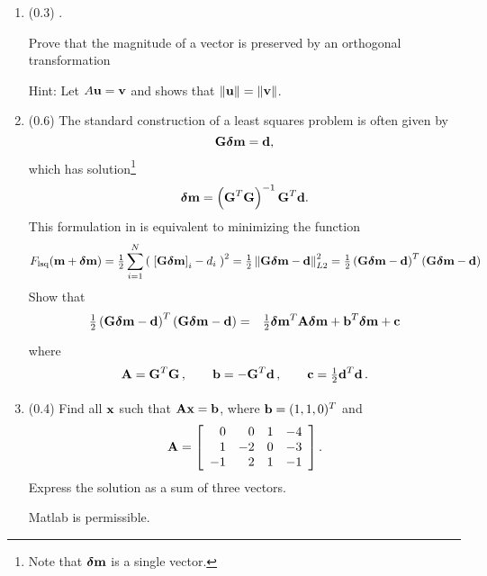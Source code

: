 \documentclass[11pt,titlepage,fleqn]{article}
\begin{document}
\begin{enumerate}

\item (0.3) \citep[][p.~473, P10]{SteinWysession}.

Prove that the magnitude of a vector is preserved by an orthogonal transformation

Hint: Let $A\mbox{${\bf u}$} = \mbox{${\bf v}$}$ and shows that $\|\mbox{${\bf u}$}\| = \|\mbox{${\bf v}$}\|$.


\item (0.6) The standard construction of a least squares problem is often given by
%
\begin{equation}
\mbox{${\bf G}$}\mbox{\boldmath $\bf \delta$}\mbox{${\bf m}$} = \mbox{${\bf d}$},
\label{lsq}
\end{equation}
%
which has solution\footnote{Note that $\mbox{\boldmath $\bf \delta$}\mbox{${\bf m}$}$ is a single vector.}
%
\begin{equation}
\mbox{\boldmath $\bf \delta$}\mbox{${\bf m}$} = \left( \mbox{${\bf G}$}^T\mbox{${\bf G}$} \right)^{-1} \mbox{${\bf G}$}^T \mbox{${\bf d}$}.
\label{lsq_sol}
\end{equation}
%
This formulation in  is equivalent to minimizing the function
%
\begin{equation}
F_{\rm lsq}(\bem+\bdelta\bem)
 =  \hlf \sum_{i=1}^N \left(\;\left[ \bG\bdelta\bem \right]_i - d_i\;\right)^2
= \hlf \left\| \bG\bdelta\bem - \bd \right\|_{L2}^2
= \hlf \left( \bG\bdelta\bem - \bd \right)^T \left( \bG\bdelta\bem - \bd \right)
\end{equation}
%
Show that 
%
\begin{eqnarray}
\hlf \left( \bG\bdelta\bem - \bd \right)^T \left( \bG\bdelta\bem - \bd \right)
&=& \hlf \bdelta\bem^T\bA\bdelta\bem + \bb^T\bdelta\bem + \bc
\label{lsq1}
\end{eqnarray}
%
where
%
\begin{equation}
\bA = \bG^T\bG
\,,\hspace{20pt}
\bb = -\bG^T\bd
\,,\hspace{20pt}
\bc = \hlf\bd^T\bd
\,.
\end{equation}


\item (0.4) Find all $\mbox{${\bf x}$}$ such that $\mbox{${\bf A}$}\mbox{${\bf x}$} = \mbox{${\bf b}$}$, where $\mbox{${\bf b}$} = (1, 1, 0)^T$ and
%
\begin{eqnarray*}
\mbox{${\bf A}$} =  \left[ \begin{array}{rrrr}
     0  &   0  &   1 & -4 \\
     1  &   -2  &   0 & -3 \\
     -1  &   2  &   1 & -1 \\
\end{array} \right].
\end{eqnarray*}
%
Express the solution as a sum of three vectors.

Matlab is permissible.

\end{enumerate}
\end{document}

